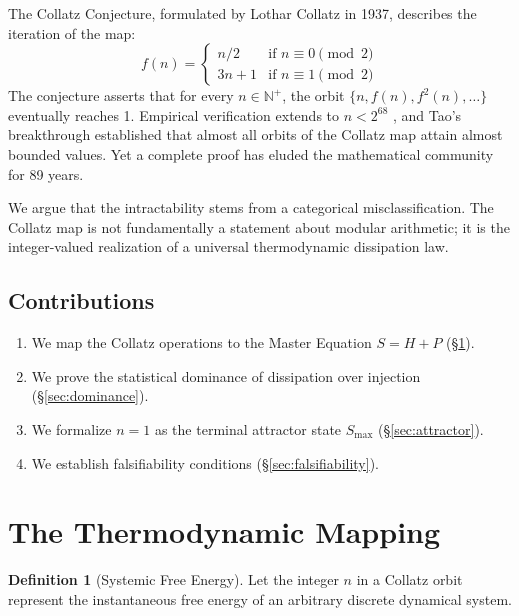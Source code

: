 \documentclass[12pt, a4paper]{article}
\theoremstyle{plain}
\theoremstyle{definition}
\newtheorem{definition}[theorem]{Definition}
\begin{document}
The Collatz Conjecture, formulated by Lothar Collatz in 1937, describes the iteration of the map:
\begin{equation}\label{eq:collatz}
    f(n) = \begin{cases}
      n / 2 & \text{if } n \equiv 0 \pmod{2} \\
      3n + 1 & \text{if } n \equiv 1 \pmod{2}
   \end{cases}
\end{equation}
The conjecture asserts that for every $n \in \mathbb{N}^+$, the orbit $\{n, f(n), f^2(n), \ldots\}$ eventually reaches 1. Empirical verification extends to $n < 2^{68}$ \citep{Oliveira2010}, and Tao's breakthrough \citeyearpar{Tao2019} established that almost all orbits of the Collatz map attain almost bounded values. Yet a complete proof has eluded the mathematical community for 89 years.

We argue that the intractability stems from a categorical misclassification. The Collatz map is not fundamentally a statement about modular arithmetic; it is the integer-valued realization of a universal thermodynamic dissipation law.

\subsection{Contributions}
\begin{enumerate}
    \item We map the Collatz operations to the Master Equation $S = H + P$ (\S\ref{sec:mapping}).
    \item We prove the statistical dominance of dissipation over injection (\S\ref{sec:dominance}).
    \item We formalize $n=1$ as the terminal attractor state $S_{\max}$ (\S\ref{sec:attractor}).
    \item We establish falsifiability conditions (\S\ref{sec:falsifiability}).
\end{enumerate}

\section{The Thermodynamic Mapping}\label{sec:mapping}

\begin{definition}[Systemic Free Energy]
Let the integer $n$ in a Collatz orbit represent the instantaneous free energy of an arbitrary discrete dynamical system.
\end{definition}
\end{document}
